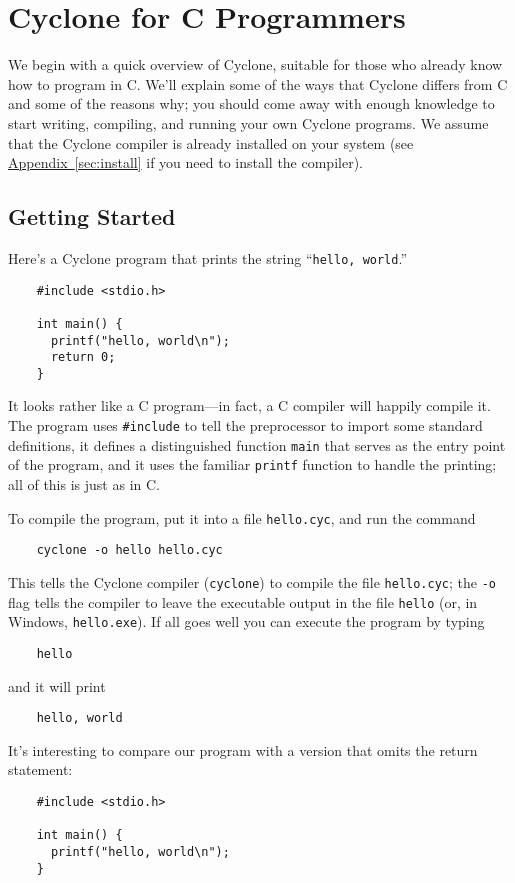 \section{Cyclone for C Programmers}

We begin with a quick overview of Cyclone, suitable for those who
already know how to program in C\@.  We'll explain some of the ways
that Cyclone differs from C and some of the reasons why; you should
come away with enough knowledge to start writing, compiling, and
running your own Cyclone programs.  We assume that the Cyclone
compiler is already installed on your system (see
\hyperref[{sec:install}]{Appendix~\ref{sec:install}}
if you need to install the compiler).

\subsection{Getting Started}

Here's a Cyclone program that prints the string ``\texttt{hello,
  world}.''
\begin{verbatim}
    #include <stdio.h>

    int main() {
      printf("hello, world\n");
      return 0;
    }
\end{verbatim}

It looks rather like a C program---in fact, a C compiler will happily
compile it.  The program uses \texttt{\#include} to tell the
preprocessor to import some standard definitions, it defines a
distinguished function \texttt{main} that serves as the entry point of
the program, and it uses the familiar \texttt{printf} function to
handle the printing; all of this is just as in C\@.

To compile the program, put it into a file \texttt{hello.cyc}, and run
the command
\begin{verbatim}
    cyclone -o hello hello.cyc 
\end{verbatim}
This tells the Cyclone compiler (\texttt{cyclone}) to compile the file
\texttt{hello.cyc}; the \texttt{-o} flag tells the compiler to leave
the executable output in the file \texttt{hello} (or, in Windows,
\texttt{hello.exe}).  If all goes well you can execute the program by
typing
\begin{verbatim}
    hello
\end{verbatim}
and it will print
\begin{verbatim}
    hello, world
\end{verbatim}

It's interesting to compare our program with a version that omits the
return statement:
\begin{verbatim}
    #include <stdio.h>

    int main() {
      printf("hello, world\n");
    }
\end{verbatim}

